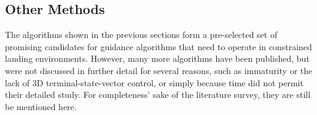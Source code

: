 \documentclass[%
]{aiaa-tc}
\begin{document}
% 

\subsection{Other Methods}

The algorithms shown in the previous sections form a pre-selected set of
promising candidates for guidance algorithms that need to operate in constrained
landing environments. However, many more algorithms have been published, but
were not discussed in further detail for several reasons, such as immaturity or
the lack of 3D terminal-state-vector control, or simply because time did not
permit their detailed study. For completeness' sake of the literature survey,
they are still be mentioned here.
\end{document}

